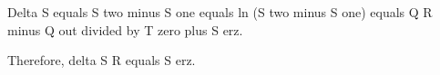 Delta S equals S two minus S one equals ln (S two minus S one) equals Q R minus Q out divided by T zero plus S erz.  

Therefore, delta S R equals S erz.
